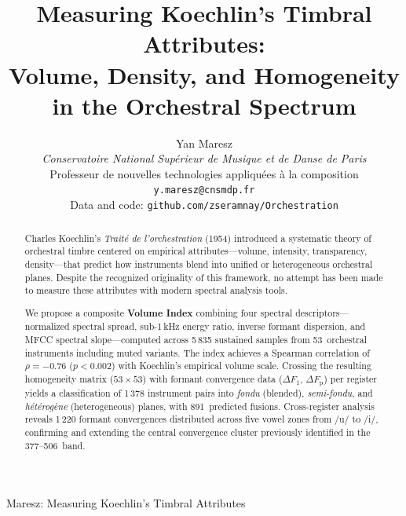 \documentclass[journal]{IEEEtran}
\newcommand{\Fp}{F_\mathrm{p}}
\newcommand{\Hz}{\,\text{Hz}}
\begin{document}
\title{Measuring Koechlin's Timbral Attributes:\\Volume, Density, and Homogeneity\\in the Orchestral Spectrum}

\author{%
  Yan Maresz\\
  \textit{Conservatoire National Supérieur de Musique et de Danse de Paris}\\
  Professeur de nouvelles technologies appliquées à la composition\\
  \texttt{y.maresz@cnsmdp.fr}\\
  Data and code: \texttt{github.com/zseramnay/Orchestration}%
  }

%
{Maresz: Measuring Koechlin's Timbral Attributes}

\maketitle

\begin{abstract}
Charles Koechlin's \textit{Traité de l'orchestration} (1954) introduced a systematic theory of orchestral timbre centered on empirical attributes---volume, intensity, transparency, density---that predict how instruments blend into unified or heterogeneous orchestral planes. Despite the recognized originality of this framework, no attempt has been made to measure these attributes with modern spectral analysis tools. 

We propose a composite \textbf{Volume Index} combining four spectral descriptors---normalized spectral spread, sub-1\,kHz energy ratio, inverse formant dispersion, and MFCC spectral slope---computed across 5\,835 sustained samples from 53~orchestral instruments including muted variants. The index achieves a Spearman correlation of $\rho = -0.76$ ($p < 0.002$) with Koechlin's empirical volume scale. Crossing the resulting homogeneity matrix ($53 \times 53$) with formant convergence data ($\Delta F_1$, $\Delta\Fp$) per register yields a classification of 1\,378 instrument pairs into \textit{fondu} (blended), \textit{semi-fondu}, and \textit{hétérogène} (heterogeneous) planes, with 891~predicted fusions. Cross-register analysis reveals 1\,220 formant convergences distributed across five vowel zones from /u/ to /i/, confirming and extending the central convergence cluster previously identified in the 377--506\Hz{} band.
\end{abstract}
\end{document}
